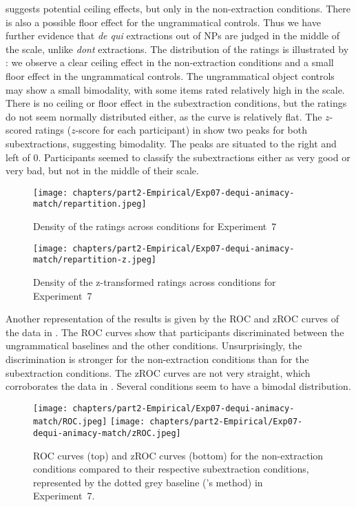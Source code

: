  suggests potential ceiling effects, but only in the non-extraction conditions. There is also a possible floor effect for the ungrammatical controls. Thus we have further evidence that \emph{de qui} extractions out of NPs are judged in the middle of the scale, unlike \emph{dont} extractions. The distribution of the ratings is illustrated by : we observe a clear ceiling effect in the non-extraction conditions and a small floor effect in the ungrammatical controls. The ungrammatical object controls may show a small bimodality, with some items rated relatively high in the scale. There is no ceiling or floor effect in the subextraction conditions, but the ratings do not seem normally distributed either, as the curve is relatively flat. The $z$-scored ratings ($z$-score for each participant) in  show two peaks for both subextractions, suggesting bimodality. The peaks are situated to the right and left of 0. Participants seemed to classify the subextractions either as very good or very bad, but not in the middle of their scale. 

\begin{figure}
    \centering
    \texttt{[image: chapters/part2-Empirical/Exp07-dequi-animacy-match/repartition.jpeg]}
    \caption{Density of the ratings across conditions for Experiment~7}
    \label{fig:exp07-repartition}
\end{figure}

\begin{figure}
    \centering
    \texttt{[image: chapters/part2-Empirical/Exp07-dequi-animacy-match/repartition-z.jpeg]}
    \caption{Density of the z-transformed ratings across conditions for Experiment~7}
    \label{fig:exp07-repartition-z}
\end{figure}

Another representation of the results is given by the ROC and zROC curves of the data in . The ROC curves show that participants discriminated between the ungrammatical baselines and the other conditions. Unsurprisingly, the discrimination is stronger for the non-extraction conditions than for the subextraction conditions. The zROC curves are not very straight, which corroborates the data in . Several conditions seem to have a bimodal distribution. 

\begin{figure}
    \centering
    \texttt{[image: chapters/part2-Empirical/Exp07-dequi-animacy-match/ROC.jpeg]}
    \texttt{[image: chapters/part2-Empirical/Exp07-dequi-animacy-match/zROC.jpeg]}
    \caption{ROC curves (top) and zROC curves (bottom) for the non-extraction conditions compared to their respective subextraction conditions, represented by the dotted grey baseline (\citealt{Dillon.2019}'s method) in Experiment~7.}
    \label{fig:exp07-ROC}
\end{figure}

